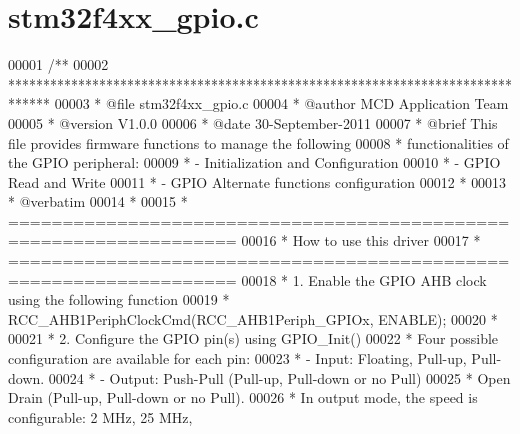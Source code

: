 \section{stm32f4xx\+\_\+gpio.\+c}
\label{stm32f4xx__gpio_8c_source}

\begin{DoxyCode}
00001 \textcolor{comment}{/**}
00002 \textcolor{comment}{  ******************************************************************************}
00003 \textcolor{comment}{  * @file    stm32f4xx\_gpio.c}
00004 \textcolor{comment}{  * @author  MCD Application Team}
00005 \textcolor{comment}{  * @version V1.0.0}
00006 \textcolor{comment}{  * @date    30-September-2011}
00007 \textcolor{comment}{  * @brief   This file provides firmware functions to manage the following }
00008 \textcolor{comment}{  *          functionalities of the GPIO peripheral:           }
00009 \textcolor{comment}{  *           - Initialization and Configuration}
00010 \textcolor{comment}{  *           - GPIO Read and Write}
00011 \textcolor{comment}{  *           - GPIO Alternate functions configuration}
00012 \textcolor{comment}{  * }
00013 \textcolor{comment}{  *  @verbatim}
00014 \textcolor{comment}{  *}
00015 \textcolor{comment}{  *          ===================================================================}
00016 \textcolor{comment}{  *                                 How to use this driver}
00017 \textcolor{comment}{  *          ===================================================================       }
00018 \textcolor{comment}{  *           1. Enable the GPIO AHB clock using the following function}
00019 \textcolor{comment}{  *                RCC\_AHB1PeriphClockCmd(RCC\_AHB1Periph\_GPIOx, ENABLE);}
00020 \textcolor{comment}{  *             }
00021 \textcolor{comment}{  *           2. Configure the GPIO pin(s) using GPIO\_Init()}
00022 \textcolor{comment}{  *              Four possible configuration are available for each pin:}
00023 \textcolor{comment}{  *                - Input: Floating, Pull-up, Pull-down.}
00024 \textcolor{comment}{  *                - Output: Push-Pull (Pull-up, Pull-down or no Pull)}
00025 \textcolor{comment}{  *                          Open Drain (Pull-up, Pull-down or no Pull).}
00026 \textcolor{comment}{  *                  In output mode, the speed is configurable: 2 MHz, 25 MHz,}

\end{DoxyCode}
